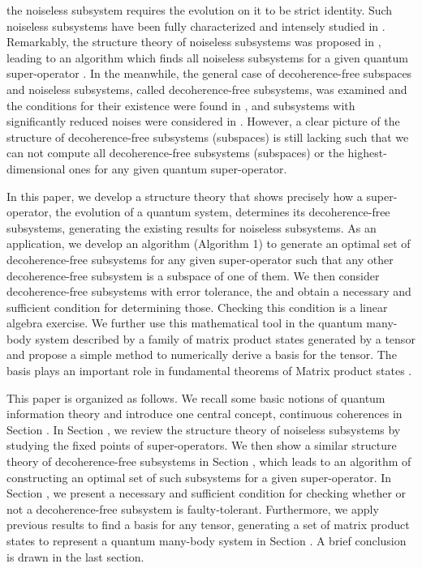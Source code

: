 \documentclass[journal]{IEEEtran}
\begin{document}
the noiseless subsystem requires the evolution on it to be strict identity. Such noiseless subsystems have been fully characterized and intensely studied in \cite{choi2006method,blume2010information,beny2007generalization,kribs2006quantum,kribs2005unified}. Remarkably, the structure theory of noiseless subsystems  was proposed in \cite{choi2006method}, leading to an algorithm which finds all noiseless subsystems for a given quantum super-operator \cite{knill2006protected,wang2013numerical}. In the meanwhile, the general case of decoherence-free subspaces and noiseless subsystems, called decoherence-free subsystems, was examined and the conditions for their existence were found in \cite{shabani2005theory}, and subsystems with significantly reduced noises  were considered in \cite{wang2016minimal}. However, a clear picture of the structure of  decoherence-free subsystems (subspaces) is still lacking such that we can not compute all decoherence-free subsystems (subspaces) or the highest-dimensional ones for any given quantum super-operator. 

In this paper,  we develop a structure theory that shows precisely how a super-operator, the evolution of a quantum system, determines its decoherence-free subsystems, generating the existing results for noiseless subsystems. As an application, we develop an algorithm (Algorithm 1) to generate an optimal set of decoherence-free subsystems for any given super-operator such that any other decoherence-free subsystem is a subspace of one of them. We then consider decoherence-free subsystems with error tolerance, the    and obtain a necessary and sufficient condition for  determining those.  Checking this condition is a linear algebra exercise.
We further use this mathematical tool in the quantum many-body system described by a family of matrix product states generated by a tensor and propose a  simple method to numerically derive   a basis for the tensor. The basis plays an important role in fundamental theorems of Matrix product states \cite{cirac2017matrix,cuevas2017irreducible}.

This paper is organized as follows. We recall some basic notions of quantum information theory and introduce one central concept, continuous coherences in Section \uppercase\expandafter{}. In Section \uppercase\expandafter{}, we review the structure theory of noiseless subsystems by studying the fixed points of super-operators. We then show a similar structure theory of decoherence-free subsystems in Section \uppercase\expandafter{}, which leads to an algorithm of constructing an optimal set of  such subsystems for a given super-operator. In Section \uppercase\expandafter{}, we present a necessary and sufficient condition for checking whether or not a decoherence-free subsystem is faulty-tolerant. Furthermore, 
we apply previous results to find a basis for any tensor, generating a set of matrix product states to represent a quantum many-body system  in Section \uppercase\expandafter{}. A brief conclusion is drawn in the last section.
\end{document}
